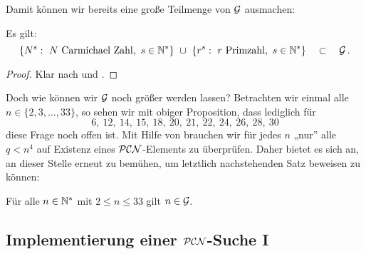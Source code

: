 Damit können wir bereits eine große Teilmenge von $\mathcal{G}$ ausmachen:

\begin{proposition}
  \label{prop:G}
  Es gilt:
  \[ \{ N^s:\ N\text{ Carmichael Zahl},\ s\in \N^\ast\} \ \cup\ 
    \{ r^s:\ r \text{ Primzahl},\ s\in \N^\ast\} \quad\subset\quad \G\,. \]
\end{proposition}
\begin{proof}
  Klar nach  und 
  .
\end{proof}

Doch wie können wir $\mathcal{G}$ noch größer werden lassen? 
Betrachten wir einmal alle $n\in \{ 2,3,\ldots,33\}$, so sehen wir mit
obiger Proposition, dass lediglich für 
\[ 6,\ 12,\ 14,\ 15,\ 18,\ 20,\ 21,\ 22,\ 24,\ 26,\ 28,\ 30\]
diese Frage noch offen ist.
Mit Hilfe von  brauchen wir für jedes $n$ 
„nur” alle $q < n^4$ auf Existenz eines $\mathcal{PCN}$-Elements zu überprüfen. Daher
bietet es sich an, an dieser Stelle erneut \sage zu bemühen, um letztlich
nachstehenden Satz beweisen zu können:

\begin{satz}
  \label{satz:hauptsatz_g}
  Für alle $n\in \mathbb{N}^\ast$ mit $2 \leq n \leq 33$ gilt
  $n \in \mathcal{G}$.
\end{satz}


\subsection{Implementierung einer $\mathcal{PCN}$-Suche I}

